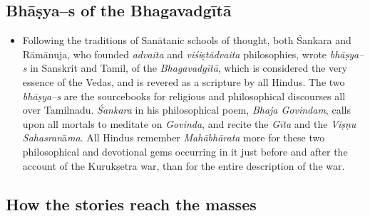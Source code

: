 \subsection*{Bhāṣya–s of the Bhagavadgītā}

\begin{itemize}
\item Following the traditions of Sanātanic schools of thought, both Śankara and Rāmānuja, who founded \textit{advaita} and \textit{viśi}ṣ\textit{tādvaita} philosophies, wrote \textit{bhāṣya–s} in Sanskrit and Tamil, of the \textit{Bhagavadgītā}, which is considered the very essence of the Vedas, and is revered as a scripture by all Hindus. The two \textit{bhāṣya–s} are the sourcebooks for religious and philosophical discourses all over Tamilnadu. \textit{Śankara} in his philosophical poem, \textit{Bhaja Govindam}, calls upon all mortals to meditate on \textit{Govinda}, and recite the \textit{Gīta} and the \textit{Viṣṇu Sahasran}ā\textit{ma}. All Hindus remember \textit{Mahābhārata} more for these two philosophical and devotional gems occurring in it just before and after the account of the Kurukṣetra war, than for the entire description of the war.

\end{itemize}


\subsection*{How the stories reach the masses}

